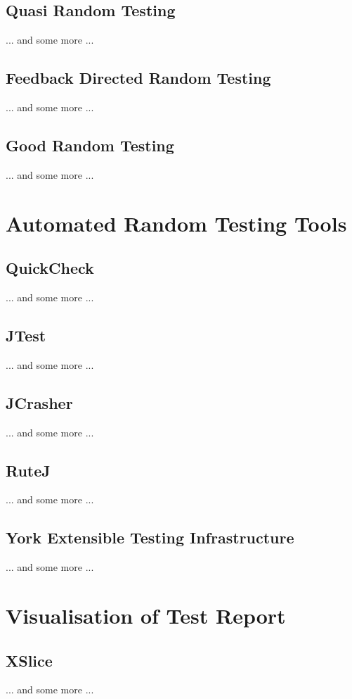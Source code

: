 \subsection{Quasi Random Testing}
... and some more ...

\subsection{Feedback Directed Random Testing}
... and some more ...

\subsection{Good Random Testing}
... and some more ...


\section{Automated Random Testing Tools}

\subsection{QuickCheck}
... and some more ...

\subsection{JTest}
... and some more ...

\subsection{JCrasher}
... and some more ...
\subsection{RuteJ}
... and some more ...

\subsection{York Extensible Testing Infrastructure}
... and some more ...

\section{Visualisation of Test Report}

\subsection{XSlice}
... and some more ...

